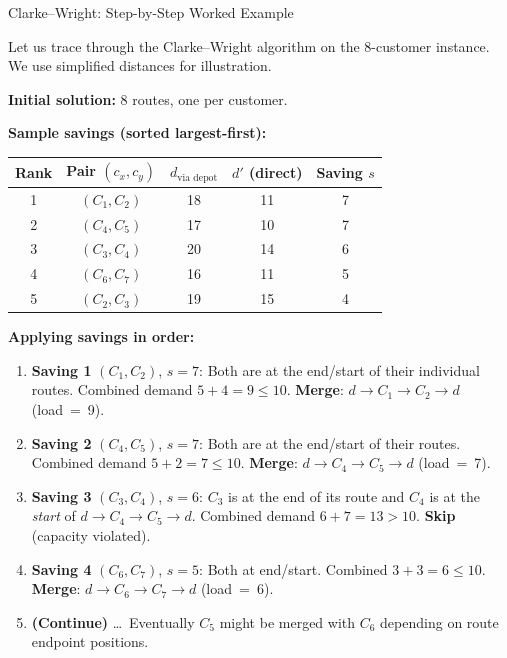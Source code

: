 \documentclass[aspectratio=169,10pt]{beamer}
\begin{document}
\begin{frame}[allowframebreaks]{Clarke--Wright: Step-by-Step Worked Example}

  Let us trace through the Clarke--Wright algorithm on the 8-customer instance.
  We use simplified distances for illustration.

  \bigskip
  \textbf{Initial solution:} 8 routes, one per customer.

  \medskip
  \textbf{Sample savings (sorted largest-first):}

  \begin{center}
    \small
    \begin{tabular}{ccccc}
      \toprule
      Rank & Pair $(c_x, c_y)$ & $d_{\text{via depot}}$ & $d'$ (direct) & Saving $s$ \\
      \midrule
      1 & $(C_1, C_2)$ & 18 & 11 & 7 \\
      2 & $(C_4, C_5)$ & 17 & 10 & 7 \\
      3 & $(C_3, C_4)$ & 20 & 14 & 6 \\
      4 & $(C_6, C_7)$ & 16 & 11 & 5 \\
      5 & $(C_2, C_3)$ & 19 & 15 & 4 \\
      \bottomrule
    \end{tabular}
  \end{center}

  \framebreak

  \textbf{Applying savings in order:}

  \medskip
  \begin{enumerate}
    \item \textbf{Saving 1} $(C_1, C_2)$, $s=7$: Both are at the end/start of
      their individual routes.  Combined demand $5+4=9 \leq 10$.
      \textbf{Merge}: $d \to C_1 \to C_2 \to d$ (load~=~9).
    \item \textbf{Saving 2} $(C_4, C_5)$, $s=7$: Both are at the end/start of
      their routes.  Combined demand $5+2=7 \leq 10$.
      \textbf{Merge}: $d \to C_4 \to C_5 \to d$ (load~=~7).
    \item \textbf{Saving 3} $(C_3, C_4)$, $s=6$: $C_3$ is at the end of its
      route and $C_4$ is at the \emph{start} of $d \to C_4 \to C_5 \to d$.
      Combined demand $6 + 7 = 13 > 10$.  \textbf{Skip} (capacity violated).
    \item \textbf{Saving 4} $(C_6, C_7)$, $s=5$: Both at end/start.
      Combined $3+3=6 \leq 10$.
      \textbf{Merge}: $d \to C_6 \to C_7 \to d$ (load~=~6).
    \item \textbf{(Continue)} \ldots\ Eventually $C_5$ might be merged with $C_6$
      depending on route endpoint positions.
  \end{enumerate}


\end{frame}
\end{document}
